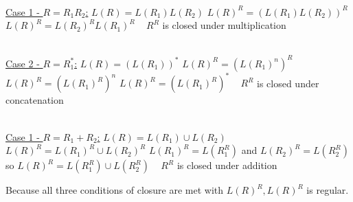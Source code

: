 \documentclass[10pt,letterpaper,unboxed,cm]{article}
\begin{document}
\begin{enumerate}
\\\underline{Case 1 - $R=R_1R_2$:} $L(R)=L(R_1)L(R_2)$ \newline
\phantom{Case 1 - $R=R_1R_2$:} $L(R)^R=(L(R_1)L(R_2))^R$ \newline
\phantom{Case 1 - $R=R_1R_2$:} $L(R)^R=L(R_2)^RL(R_1)^R$ \newline
\phantom{Case 1 - $R=R_1R_2$:} \therefore ~ $R^R$ is closed under multiplication \newline

\\\underline{Case 2 - $R=R_1^*$:} $L(R)=(L(R_1))^*$ \newline
\phantom{Case 1 - $R=R_1R_2$:} $L(R)^R=(L(R_1)^n)^R$ \newline
\phantom{Case 1 - $R=R_1R_2$:} $L(R)^R=(L(R_1)^R)^n$ \newline
\phantom{Case 1 - $R=R_1R_2$:} $L(R)^R=(L(R_1)^R)^*$ \newline
\phantom{Case 1 - $R=R_1R_2$:} \therefore ~ $R^R$ is closed under concatenation \newline

\\\underline{Case 1 - $R=R_1+R_2$:} $L(R)=L(R_1) \cup L(R_2)$ \newline
\phantom{Case 1 - $R=R_1R_2$:} $L(R)^R=L(R_1)^R \cup L(R_2)^R$ \newline
\phantom{Case 1 - $R=R_1R_2$:} $L(R_1)^R=L(R_1^R)$ and $L(R_2)^R=L(R_2^R)$ so $L(R)^R=L(R_1^R) \cup L(R_2^R)$  \newline
\phantom{Case 1 - $R=R_1R_2$:} \therefore ~ $R^R$ is closed under addition \newline

Because all three conditions of closure are met with $L(R)^R, L(R)^R$ is regular.

\end{enumerate}
\end{document}

